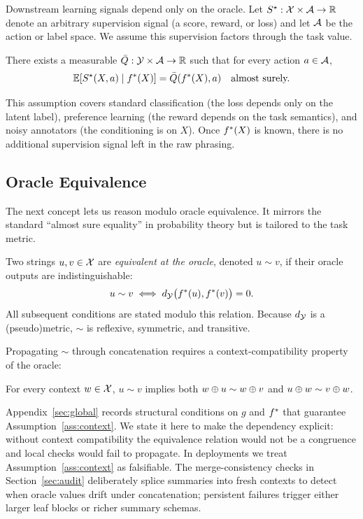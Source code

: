 Downstream learning signals depend only on the oracle. Let $S^\star: \mathcal{X} \times \mathcal{A} \to \mathbb{R}$ denote an arbitrary supervision signal (a score, reward, or loss) and let $\mathcal{A}$ be the action or label space. We assume this supervision factors through the task value.

\begin{assumption}\label{ass:CF}
There exists a measurable $\bar{Q}: \mathcal{Y} \times \mathcal{A} \to \mathbb{R}$ such that for every action $a \in \mathcal{A}$,
\[
\mathbb{E}\!\left[S^\star(X, a) \mid f^{\ast}(X)\right] = \bar{Q}(f^{\ast}(X), a) \quad \text{almost surely.}
\]
\end{assumption}

This assumption covers standard classification (the loss depends only on the latent label), preference learning (the reward depends on the task semantics), and noisy annotators (the conditioning is on $X$). Once $f^{\ast}(X)$ is known, there is no additional supervision signal left in the raw phrasing.

\subsection{Oracle Equivalence}

The next concept lets us reason modulo oracle equivalence. It mirrors the standard ``almost sure equality'' in probability theory but is tailored to the task metric.

\begin{definition}\label{def:oracle-equivalence}
Two strings $u, v \in \mathcal{X}$ are \emph{equivalent at the oracle}, denoted $u \sim v$, if their oracle outputs are indistinguishable:
\[
u \sim v \;\Longleftrightarrow\; d_{\mathcal{Y}}\big(f^{\ast}(u), f^{\ast}(v)\big) = 0.
\]
All subsequent conditions are stated modulo this relation. Because $d_{\mathcal{Y}}$ is a (pseudo)metric, $\sim$ is reflexive, symmetric, and transitive.
\end{definition}

Propagating $\sim$ through concatenation requires a context-compatibility property of the oracle:

\begin{assumption}\label{ass:context}
For every context $w \in \mathcal{X}$, $u \sim v$ implies both $w \oplus u \sim w \oplus v$ and $u \oplus w \sim v \oplus w$.
\end{assumption}

Appendix~\ref{sec:global} records structural conditions on $g$ and $f^{\ast}$ that guarantee Assumption~\ref{ass:context}. We state it here to make the dependency explicit: without context compatibility the equivalence relation would not be a congruence and local checks would fail to propagate. In deployments we treat Assumption~\ref{ass:context} as falsifiable. The merge-consistency checks in Section~\ref{sec:audit} deliberately splice summaries into fresh contexts to detect when oracle values drift under concatenation; persistent failures trigger either larger leaf blocks or richer summary schemas.

